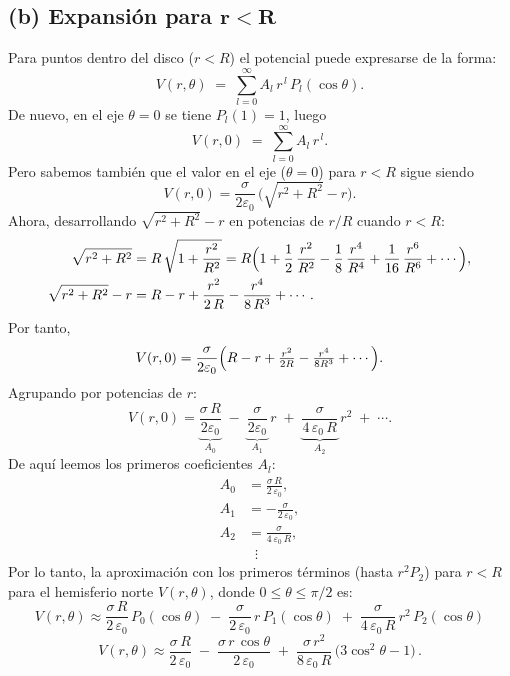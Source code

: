 \documentclass[12pt]{article}
\begin{document}
\subsection*{(b) Expansión para \(\boldsymbol{r<R}\)}

Para puntos dentro del disco (\(r<R\))  el potencial puede expresarse de la forma:
\[
V(r,\theta)
\;=\;
\sum_{l=0}^{\infty} A_{l}\,r^{\,l}\,P_{l}(\cos\theta).
\]
De nuevo, en el eje \(\theta=0\) se tiene \(P_{l}(1) = 1\), luego
\[
V(r,0) \;=\; \sum_{l=0}^{\infty} A_{l}\,r^{\,l}.
\]
Pero sabemos también que el valor en el eje (\(\theta=0\)) para \(r<R\) sigue siendo
\[
V(r,0) 
= \frac{\sigma}{2\varepsilon_{0}}\,\bigl(\sqrt{r^{2}+R^{2}} - r\bigr).
\]
Ahora, desarrollando \(\sqrt{r^{2}+R^{2}} - r\) en potencias de \(r/R\) cuando \(r<R\):
\begin{align*}
\sqrt{r^{2} + R^{2}}
&= R\,\sqrt{1 + \frac{r^{2}}{R^{2}}}
= R \Bigl( 1 + \frac{1}{2}\,\frac{r^{2}}{R^{2}} - \frac{1}{8}\,\frac{r^{4}}{R^{4}} 
      + \frac{1}{16}\,\frac{r^{6}}{R^{6}} + \cdots \Bigr),\\
%
\sqrt{r^{2} + R^{2}} - r
&= R - r + \frac{r^{2}}{2\,R} - \frac{r^{4}}{8\,R^{3}} + \cdots.
\end{align*}
Por tanto,
\[
V(r,0)
= \frac{\sigma}{2\varepsilon_{0}} 
  \Bigl(R - r + \tfrac{r^{2}}{2R} - \tfrac{r^{4}}{8R^{3}} + \cdots \Bigr).
\]
Agrupando por potencias de \(r\):
\[
V(r,0)
= \underbrace{\frac{\sigma\,R}{2\varepsilon_{0}}}_{A_{0}} 
  \;-\; \underbrace{\frac{\sigma}{2\varepsilon_{0}}}_{A_{1}}\,r 
  \;+\; \underbrace{\frac{\sigma}{4\,\varepsilon_{0}\,R}}_{A_{2}}\,r^{2} 
  \;+\; \cdots.
\]
De aquí leemos los primeros coeficientes \(A_{l}\):
\[
\begin{aligned}
A_{0} &= \frac{\sigma\,R}{2\,\varepsilon_{0}}, \\[6pt]
A_{1} &= -\frac{\sigma}{2\,\varepsilon_{0}}, \\[6pt]
A_{2} &= \frac{\sigma}{4\,\varepsilon_{0}\,R}, \\[6pt]
&\;\;\vdots
\end{aligned}
\]
Por lo tanto, la aproximación con los primeros términos (hasta \(r^{2}P_{2}\)) para \(r<R\) para el hemisferio norte \(V(r,\theta)\), donde \(0 \le\theta\le\pi/2\)  es:
\[
V(r,\theta)
\approx
\frac{\sigma\,R}{2\,\varepsilon_{0}}\,P_{0}(\cos\theta)
\;-\; \frac{\sigma}{2\,\varepsilon_{0}}\,r\,P_{1}(\cos\theta)
\;+\; \frac{\sigma}{4\,\varepsilon_{0}\,R}\,r^{2}\,P_{2}(\cos\theta)
\]
\[
V(r,\theta)\approx
\frac{\sigma\,R}{2\,\varepsilon_{0}}
\;-\;
\frac{\sigma\,r\,\cos\theta}{2\,\varepsilon_{0}}
\;+\;
\frac{\sigma\,r^{2}}{8\,\varepsilon_{0}\,R}\,\bigl(3\cos^{2}\theta - 1\bigr)\,.
\]
\end{document}
